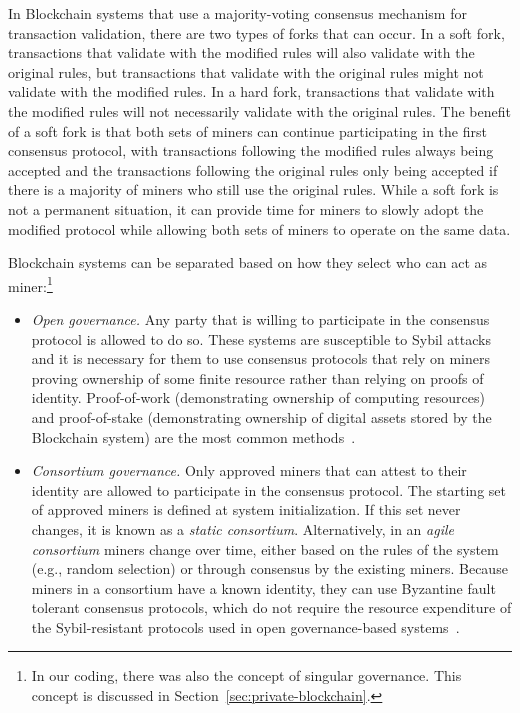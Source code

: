 In Blockchain systems that use a majority-voting consensus mechanism for transaction validation, there are two types of forks that can occur.
In a soft fork, transactions that validate with the modified rules will also validate with the original rules, but transactions that validate with the original rules might not validate with the modified rules.
In a hard fork, transactions that validate with the modified rules will not necessarily validate with the original rules.
The benefit of a soft fork is that both sets of miners can continue participating in the first consensus protocol, with transactions following the modified rules always being accepted and the transactions following the original rules only being accepted if there is a majority of miners who still use the original rules.
While a soft fork is not a permanent situation, it can provide time for miners to slowly adopt the modified protocol while allowing both sets of miners to operate on the same data.

Blockchain systems can be separated based on how they select who can act as miner:\footnote{In our coding, there was also the concept of singular governance. This concept is discussed in Section~\ref{sec:private-blockchain}.}

\begin{itemize}
	\item \emph{Open governance.}
	Any party that is willing to participate in the consensus protocol is allowed to do so.
	These systems are susceptible to Sybil attacks and it is necessary for them to use consensus protocols that rely on miners proving ownership of some finite resource rather than relying on proofs of identity.
	Proof-of-work (demonstrating ownership of computing resources) and proof-of-stake (demonstrating ownership of digital assets stored by the Blockchain system) are the most common methods~\cite{Bano17,garay2018consensus}.
	
	\item \emph{Consortium governance.}
	Only approved miners that can attest to their identity are allowed to participate in the consensus protocol.
	The starting set of approved miners is defined at system initialization.
	If this set never changes, it is known as a \emph{static consortium}.
	Alternatively, in an \emph{agile consortium} miners change over time, either based on the rules of the system (e.g., random selection) or through consensus by the existing miners.
	Because miners in a consortium have a known identity, they can use Byzantine fault tolerant consensus protocols, which do not require the resource expenditure of the Sybil-resistant protocols used in open governance-based systems~\cite{Bano17,garay2018consensus}.		
\end{itemize}


